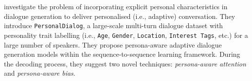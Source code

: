 \cite{zheng2019personalized} investigate the problem of incorporating explicit personal characteristics in dialogue generation to deliver personalised (i.e., adaptive) conversation. They introduce \texttt{PersonalDialog}, a large-scale multi-turn dialogue dataset with personality trait labelling (i.e., \texttt{Age}, \texttt{Gender}, \texttt{Location}, \texttt{Interest Tags}, etc.) for a large number of speakers. They propose persona-aware adaptive dialogue generation models within the sequence-to-sequence learning framework. During the decoding process, they suggest two novel techniques: \textit{persona-aware attention} and \textit{persona-aware bias}.